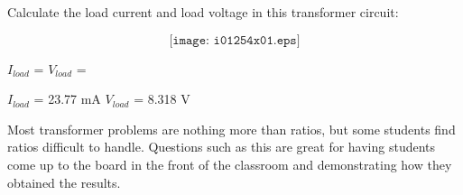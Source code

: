 

Calculate the load current and load voltage in this transformer circuit:

$$\texttt{[image: i01254x01.eps]}$$

$I_{load}$ = \hskip 80pt $V_{load}$ =

\vskip 10pt







$I_{load}$ = 23.77 mA \hskip 80pt $V_{load}$ = 8.318 V







Most transformer problems are nothing more than ratios, but some students find ratios difficult to handle.  Questions such as this are great for having students come up to the board in the front of the classroom and demonstrating how they obtained the results.




